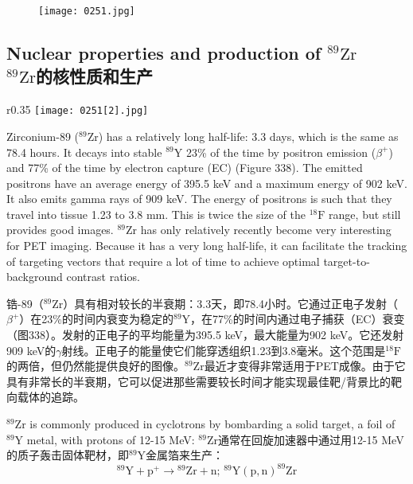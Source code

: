\documentclass[dvipsnames, svgnames,a4paper,11pt]{article}
\begin{document}
\begin{figure}[h]
	\centering
    \texttt{[image: 0251.jpg]}  
     \label{fig337}
\end{figure}

\subsection{Nuclear properties and production of \(\mathrm{{}^{89}Zr}\)\\ \(\mathrm{{}^{89}Zr}\)的核性质和生产}  

\begin{wrapfigure}{r}{0.35\textwidth}
    \centering
    \texttt{[image: 0251[2].jpg]}
     \label{fig338}
\end{wrapfigure}

Zirconium-89 (\(\mathrm{^{89}Zr}\)) has a relatively long half-life: 3.3 days, which is the same as 78.4 hours. It decays into stable \(\mathrm{^{89}Y}\) 23\% of the time by positron emission (\(\beta^+\)) and 77\% of the time by electron capture (EC) (Figure 338). The emitted positrons have an average energy of 395.5 keV and a maximum energy of 902 keV. It also emits gamma rays of 909 keV. The energy of positrons is such that they travel into tissue 1.23 to 3.8 mm. This is twice the size of the \(\mathrm{^{18}F}\) range, but still provides good images. \(\mathrm{^{89}Zr}\) has only relatively recently become very interesting for PET imaging. Because it has a very long half-life, it can facilitate the tracking of targeting vectors that require a lot of time to achieve optimal target-to-background contrast ratios.  

锆-89（\(\mathrm{^{89}Zr}\)）具有相对较长的半衰期：3.3天，即78.4小时。它通过正电子发射（\(\beta^+\)）在23\%的时间内衰变为稳定的\(\mathrm{^{89}Y}\)，在77\%的时间内通过电子捕获（EC）衰变（图338）。发射的正电子的平均能量为395.5 keV，最大能量为902 keV。它还发射909 keV的$\gamma$射线。正电子的能量使它们能穿透组织1.23到3.8毫米。这个范围是\(\mathrm{^{18}F}\)的两倍，但仍然能提供良好的图像。\(\mathrm{^{89}Zr}\)最近才变得非常适用于PET成像。由于它具有非常长的半衰期，它可以促进那些需要较长时间才能实现最佳靶/背景比的靶向载体的追踪。  

\(\mathrm{^{89}Zr}\) is commonly produced in cyclotrons by bombarding a solid target, a foil of \(\mathrm{^{89}Y}\) metal, with protons of 12-15 MeV:  
\(\mathrm{^{89}Zr}\)通常在回旋加速器中通过用12-15 MeV的质子轰击固体靶材，即\(\mathrm{^{89}Y}\)金属箔来生产：  
\[
\mathrm{^{89}Y + p^+ \rightarrow {}^{89}Zr + n; \, ^{89}Y(p,n)^{89}Zr}
\]  
\end{document}
